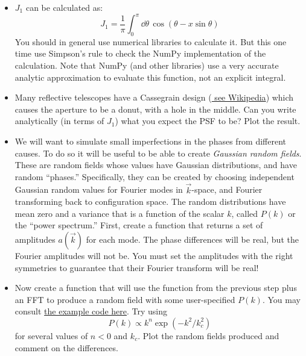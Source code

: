\documentclass[11pt, preprint]{aastex}
\begin{document}
\begin{itemize}
\item $J_1$ can be calculated as:
  \begin{equation}
   J_1 = \frac{1}{\pi} \int_0^\pi \dd\theta\, \cos\left(\theta -
   x\sin\theta\right)
  \end{equation}
  You should in general use numerical libraries to calculate it.  But
  this one time use Simpson's rule to check the NumPy implementation
  of the calculation. Note that NumPy (and other libraries) use a very
  accurate analytic approximation to evaluate this function, not an
  explicit integral.
\item Many reflective telescopes have a Cassegrain design
  (\href{https://en.wikipedia.org/wiki/Cassegrain_reflector}{\color{blue}
  see Wikipedia}) which causes the aperture to be a donut, with a hole
  in the middle. Can you write analytically (in terms of $J_1$) what
  you expect the PSF to be? Plot the result.
\item We will want to simulate small imperfections in the phases from
  different causes. To do so it will be useful to be able to create
  {\it Gaussian random fields}. These are random fields whose values
  have Gaussian distributions, and have random ``phases.''
  Specifically, they can be created by choosing independent Gaussian
  random values for Fourier modes in $\vec{k}$-space, and Fourier
  transforming back to configuration space. The random distributions
  have mean zero and a variance that is a function of the scalar $k$,
  called $P(k)$ or the ``power spectrum.'' First, create a function
  that returns a set of amplitudes $a(\vec{k})$ for each mode. The
  phase differences will be real, but the Fourier amplitudes will not
  be. You must set the amplitudes with the right symmetries to
  guarantee that their Fourier transform will be real!
\item Now create a function that will use the function from the
  previous step plus an FFT to produce a random
  field with some user-specified $P(k)$. You may consult
  \href{http://andrewwalker.github.io/statefultransitions/post/gaussian-fields/}{\color{blue}
    the example code here}. Try using
  \begin{equation}
    P(k) \propto k^{n} \exp\left(- k^2 / k_c^2\right)
  \end{equation}
    for several values of $n<0$ and $k_c$. Plot the random fields
    produced and comment on the differences.
\end{itemize}
\end{document}
